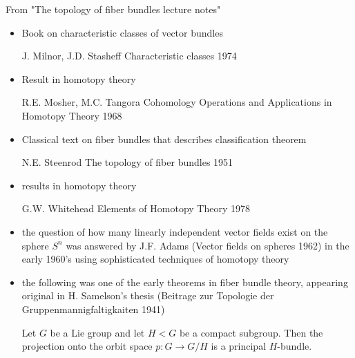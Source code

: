 From "The topology of fiber bundles lecture notes"
\begin{itemize}
	\item 
	Book on characteristic classes of vector bundles
	
	J. Milnor, J.D. Stasheff Characteristic classes 1974
	\item
	Result in homotopy theory
	
	R.E. Mosher, M.C. Tangora Cohomology Operations and Applications in Homotopy Theory 1968
	\item
	Classical text on fiber bundles that describes classification theorem 
	
	N.E. Steenrod The topology of fiber bundles 1951
	\item
	results in homotopy theory
	
	G.W. Whitehead Elements of Homotopy Theory 1978
	
	\item
	the question of how many linearly independent vector fields exist on the sphere $S^n$ was answered by J.F. Adams (Vector fields on spheres 1962) in the early 1960's using sophisticated techniques of homotopy theory
	\item
	the following was one of the early theorems in fiber bundle theory, appearing original in H. Samelson's thesis (Beitrage zur Topologie der Gruppenmannigfaltigkaiten 1941)
	
	Let $G$ be a Lie group and let $H<G$ be a compact subgroup. Then the projection onto the orbit space $p:G\rightarrow G/H$ is a principal $H$-bundle.
	
\end{itemize}

